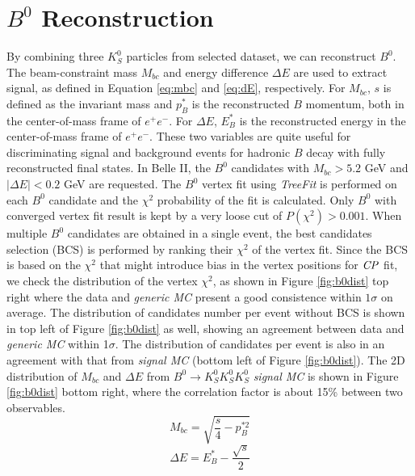 \section{$B^0$  Reconstruction}
By combining three $K_S^0$ particles from selected dataset, we can reconstruct $B^0$. The beam-constraint mass $M_{bc}$ and energy difference $\Delta E$ are used to extract signal, as defined in Equation \ref{eq:mbc} and \ref{eq:dE}, respectively. For $M_{bc}$, $s$ is defined as the invariant mass and $p^*_B$ is the reconstructed $B$ momentum, both in the center-of-mass frame of $e^+e^-$. For $\Delta E$, $E^*_B$ is the reconstructed energy in the center-of-mass frame of $e^+e^-$. These two variables are quite useful for discriminating signal and background events for hadronic $B$ decay with fully reconstructed final states.
 In Belle II, the $B^0$ candidates with $M_{bc} > 5.2$ GeV and $|\Delta{E}| < 0.2$ GeV are requested. The $B^0$ vertex fit using \textit{TreeFit} is performed on each $B^0$ candidate and the $\chi^2$ probability of the fit is calculated.  Only $B^0$ with converged vertex fit result is kept by a very loose cut of  $P(\chi^2)> 0.001$. When multiple $B^0$ candidates are obtained in a single event, the best candidates selection (BCS) is performed by ranking their $\chi^2$ of the vertex fit. Since the BCS is based on the $\chi^2$ that might introduce bias in the vertex positions for $\it{CP}$ fit, we check the distribution of the vertex $\chi^2$, as shown in Figure \ref{fig:b0dist} top right where the data and \textit{generic MC} present a good consistence within $1\sigma$ on average. The distribution of candidates number per event without BCS is shown in top left of Figure \ref{fig:b0dist} as well, showing an agreement between data and \textit{generic MC} within 1$\sigma$. The distribution of candidates per event is also in an agreement with that from \textit{signal MC} (bottom left of Figure \ref{fig:b0dist}). The 2D distribution of $M_{bc}$ and $\Delta E$ from $B^0 \to K_S^0  K_S^0  K_S^0$ \textit{signal MC} is shown in Figure \ref{fig:b0dist}  bottom right, where the correlation factor is about 15\% between two observables. 
 \begin{equation}\label{eq:mbc}
 M_{bc} = \sqrt{\frac{s}{4}-p^{*2}_B} 
 \end{equation}
 \begin{equation}\label{eq:dE}
 \Delta E = E^*_B - \frac{\sqrt{s}}{2}
 \end{equation}
